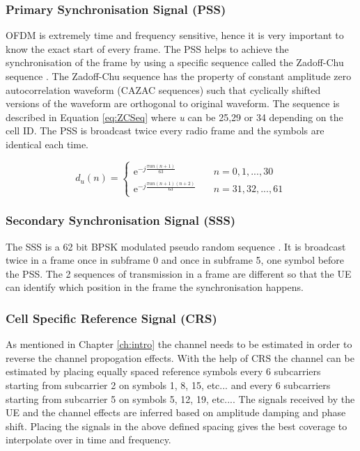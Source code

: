 \subsubsection {Primary Synchronisation Signal (PSS)} \label{sssec:PSS}
        OFDM is extremely time and frequency sensitive, hence it is very important to know the exact start of every frame. The PSS helps to achieve the synchronisation of the frame by using a specific sequence called the Zadoff-Chu sequence \cite{3gpp36211}.
        The Zadoff-Chu sequence has the property of constant amplitude zero autocorrelation waveform (CAZAC sequences) such that cyclically shifted versions of the waveform are orthogonal to original waveform. The sequence is described in Equation \ref{eq:ZCSeq} where {\em u}  can be 25,29 or 34 depending on the cell ID.
        The PSS is broadcast twice every radio frame and the symbols are identical each time.

\begin{equation} \label{eq:ZCSeq}
        d_u(n) =
        \begin{cases}
            \mathrm{e}^{-j\frac{\pi un(n+1)}{63}}       & \quad n=0,1,...,30\\
            \mathrm{e}^{-j\frac{\pi un(n+1)(n+2)}{63}} & \quad n=31,32,...,61
        \end{cases}
\end{equation}

\subsubsection{Secondary Synchronisation Signal (SSS)} \label{sssec:SSS}
        The SSS is a 62 bit BPSK modulated pseudo random sequence \cite{3gpp36211}. It is broadcast twice in a frame once in subframe 0 and once in subframe 5, one symbol before the PSS. The 2 sequences of transmission in a frame are different so that the UE can identify which position in the frame the synchronisation happens.

\subsubsection{Cell Specific Reference Signal (CRS)} \label{sssec:CRS}
        As mentioned in Chapter \ref{ch:intro} the channel needs to be estimated in order to reverse the channel propogation effects. With the help of CRS the channel can be estimated by placing equally spaced reference symbols every 6 subcarriers starting from subcarrier 2 on symbols 1, 8, 15, etc... and every 6 subcarriers starting from subcarrier 5 on symbols 5, 12, 19, etc...\cite{3gpp36211}. The signals received by the UE and the channel effects are inferred based on amplitude damping and phase shift. Placing the signals in the above defined spacing gives the best coverage to interpolate over in time and frequency.

